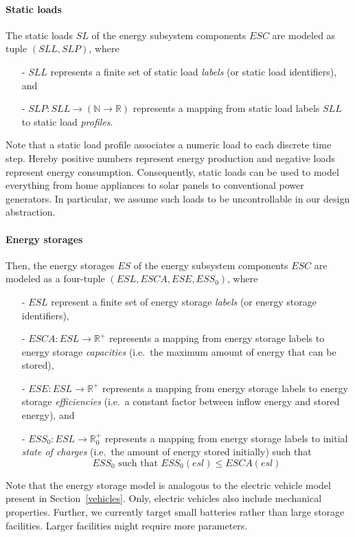 \paragraph{Static loads}
\label{static_loads}

The static loads $SL$ of the energy subsystem components $ESC$ are modeled as tuple $(SLL, SLP)$, where
\begin{itemize}
	\item[-] $SLL$ represents a finite set of static load \textit{labels} (or static load identifiers), and
	\item[-] $SLP: SLL \rightarrow (\mathbb{N} \rightarrow \mathbb{R})$ represents a mapping from static load labels $SLL$ to static load \textit{profiles}.
\end{itemize}
Note that a static load profile associates a numeric load to each discrete time step. Hereby positive numbers represent energy production and negative loads represent energy consumption. Consequently, static loads can be used to model everything from home appliances to solar panels to conventional power generators. In particular, we assume such loads to be uncontrollable in our design abstraction.


\paragraph{Energy storages}
\label{energy_storages}

Then, the energy storages $ES$ of the energy subsystem components $ESC$ are modeled as a four-tuple $(ESL, ESCA, ESE, ESS_0)$, where
\begin{itemize}
	\item[-] $ESL$ represent a finite set of energy storage \textit{labels} (or energy storage identifiers),
	\item[-] $ESCA: ESL \rightarrow \mathbb{R}^+$ represents a mapping from energy storage labels to energy storage \textit{capacities} (i.e.\ the maximum amount of energy that can be stored),
	\item[-] $ESE: ESL \rightarrow \mathbb{R}^+$ represents a mapping from energy storage labels to energy storage \textit{efficiencies} (i.e.\ a constant factor between inflow energy and stored energy), and
	\item[-] $ESS_0: ESL \rightarrow \mathbb{R}_0^+$ represents a mapping from energy storage labels to initial \textit{state of charges} (i.e.\ the amount of energy stored initially) such that
	\[
		ESS_0 \textrm{ such that } ESS_0(esl) \leq ESCA(esl)
	\]
\end{itemize}
Note that the energy storage model is analogous to the electric vehicle model present in Section~\ref{vehicles}. Only, electric vehicles also include mechanical properties. Further, we currently target small batteries rather than large storage facilities. Larger facilities might require more parameters.

